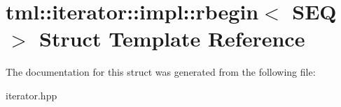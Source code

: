 \hypertarget{structtml_1_1iterator_1_1impl_1_1rbegin}{\section{tml\+:\+:iterator\+:\+:impl\+:\+:rbegin$<$ S\+E\+Q $>$ Struct Template Reference}
\label{structtml_1_1iterator_1_1impl_1_1rbegin}
}


The documentation for this struct was generated from the following file\+:\begin{DoxyCompactItemize}
\item 
iterator.\+hpp\end{DoxyCompactItemize}
